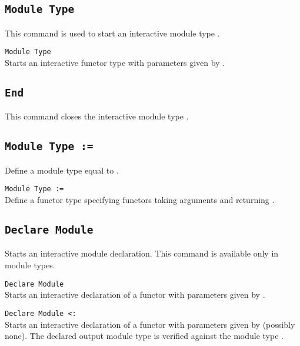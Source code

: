 \subsection{\tt Module Type {\ident}}
This command is used to start an interactive module type {\ident}.

\begin{Variants}
\item{\tt Module Type {\ident} {\modbindings}}\\
  Starts an interactive functor type with parameters given by {\modbindings}.
\end{Variants}

\subsection{\tt End {\ident}}
This command closes the interactive module type {\ident}.

\begin{ErrMsgs}
\item {}
\end{ErrMsgs}

\subsection{\tt Module Type {\ident} := {\modtype}}
Define a module type {\ident} equal to {\modtype}.

\begin{Variants}
\item {\tt Module Type {\ident} {\modbindings} := {\modtype}} \\
  Define a functor type {\ident} specifying functors taking arguments
  {\modbindings} and returning {\modtype}.
\end{Variants}

\subsection{\tt Declare Module {\ident}}
Starts an interactive module declaration. This command is available
only in module types. 

\begin{Variants}
\item{\tt Declare Module {\ident} {\modbindings}}\\
  Starts an interactive declaration of a functor with parameters given
  by {\modbindings}.
\item{\tt Declare Module {\ident} {\modbindings} \verb.<:. {\modtype}}\\
  Starts an interactive declaration of a functor with parameters given
  by {\modbindings} (possibly none). The declared output module type is
  verified against the module type {\modtype}.
\end{Variants}

